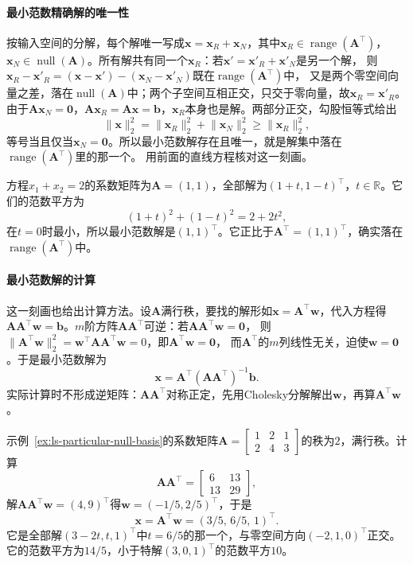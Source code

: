\paragraph{最小范数精确解的唯一性}

按输入空间的分解，每个解唯一写成$\bm x=\bm x_R+\bm x_N$，其中$\bm x_R\in\operatorname{range}(\bm A^\top)$，
$\bm x_N\in\operatorname{null}(\bm A)$。所有解共有同一个$\bm x_R$：若$\bm x'=\bm x'_R+\bm x'_N$是另一个解，
则$\bm x_R-\bm x'_R=(\bm x-\bm x')-(\bm x_N-\bm x'_N)$既在$\operatorname{range}(\bm A^\top)$中，
又是两个零空间向量之差，落在$\operatorname{null}(\bm A)$中；两个子空间互相正交，只交于零向量，故$\bm x_R=\bm x'_R$。
由于$\bm A\bm x_N=\bm0$，$\bm A\bm x_R=\bm A\bm x=\bm b$，$\bm x_R$本身也是解。两部分正交，勾股恒等式给出
\[
 \lVert\bm x\rVert_2^2=\lVert\bm x_R\rVert_2^2+\lVert\bm x_N\rVert_2^2\geq\lVert\bm x_R\rVert_2^2,
\]
等号当且仅当$\bm x_N=\bm0$。所以最小范数解存在且唯一，就是解集中落在$\operatorname{range}(\bm A^\top)$里的那一个。
用前面的直线方程核对这一刻画。

\begin{example}[直线$x_1+x_2=2$上的最小范数解]
\label{ex:ls-min-norm-line}
方程$x_1+x_2=2$的系数矩阵为$\bm A=(1,1)$，全部解为$(1+t,1-t)^\top$，$t\in\mathbb R$。它们的范数平方为
\[
 (1+t)^2+(1-t)^2=2+2t^2,
\]
在$t=0$时最小，所以最小范数解是$(1,1)^\top$。它正比于$\bm A^\top=(1,1)^\top$，确实落在$\operatorname{range}(\bm A^\top)$中。
\end{example}

\paragraph{最小范数解的计算}

这一刻画也给出计算方法。设$\bm A$满行秩，要找的解形如$\bm x=\bm A^\top\bm w$，代入方程得
$\bm A\bm A^\top\bm w=\bm b$。$m$阶方阵$\bm A\bm A^\top$可逆：若$\bm A\bm A^\top\bm w=\bm0$，
则$\lVert\bm A^\top\bm w\rVert_2^2=\bm w^\top\bm A\bm A^\top\bm w=0$，即$\bm A^\top\bm w=\bm0$，
而$\bm A^\top$的$m$列线性无关，迫使$\bm w=\bm0$。于是最小范数解为
\[
 \bm x=\bm A^\top(\bm A\bm A^\top)^{-1}\bm b .
\]
实际计算时不形成逆矩阵：$\bm A\bm A^\top$对称正定，先用Cholesky分解解出$\bm w$，再算$\bm A^\top\bm w$。

\begin{example}[满行秩方程的最小范数解]
\label{ex:ls-min-norm-row-full-rank}
示例~\ref{ex:ls-particular-null-basis}的系数矩阵$\bm A=\left[\begin{smallmatrix}1&2&1\\2&4&3\end{smallmatrix}\right]$的秩为$2$，满行秩。计算
\[
 \bm A\bm A^\top=\begin{bmatrix}6&13\\13&29\end{bmatrix},
\]
解$\bm A\bm A^\top\bm w=(4,9)^\top$得$\bm w=(-1/5,2/5)^\top$，于是
\[
 \bm x=\bm A^\top\bm w=(3/5,\,6/5,\,1)^\top .
\]
它是全部解$(3-2t,t,1)^\top$中$t=6/5$的那一个，与零空间方向$(-2,1,0)^\top$正交。
它的范数平方为$14/5$，小于特解$(3,0,1)^\top$的范数平方$10$。
\end{example}

